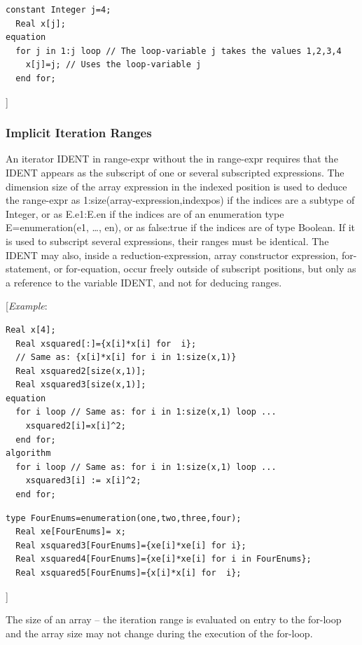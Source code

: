 \documentclass[10pt,a4paper]{report}
\def\doublelabel#1{\label{#1}}
\begin{document}
\begin{lstlisting}[language=modelica]
  constant Integer j=4;
  Real x[j];
equation
  for j in 1:j loop // The loop-variable j takes the values 1,2,3,4
    x[j]=j; // Uses the loop-variable j
  end for;
\end{lstlisting}
{]}

\subsubsection{Implicit Iteration Ranges}\doublelabel{implicit-iteration-ranges}

An iterator IDENT in range-expr without the in range-expr requires that
the IDENT appears as the subscript of one or several subscripted
expressions. The dimension size of the array expression in the indexed
position is used to deduce the range-expr as
1:size(array-expression,indexpos) if the indices are a subtype of
Integer, or as E.e1:E.en if the indices are of an enumeration type
E=enumeration(e1, \ldots{}, en), or as false:true if the indices are of
type Boolean. If it is used to subscript several expressions, their
ranges must be identical. The IDENT may also, inside a
reduction-expression, array constructor expression, for-statement, or
for-equation, occur freely outside of subscript positions, but only as a
reference to the variable IDENT, and not for deducing ranges.

{[}\emph{Example}:

\begin{lstlisting}[language=modelica]
  Real x[4];
  Real xsquared[:]={x[i]*x[i] for  i};
  // Same as: {x[i]*x[i] for i in 1:size(x,1)}
  Real xsquared2[size(x,1)];
  Real xsquared3[size(x,1)];
equation
  for i loop // Same as: for i in 1:size(x,1) loop ...
    xsquared2[i]=x[i]^2;
  end for;
algorithm
  for i loop // Same as: for i in 1:size(x,1) loop ...
    xsquared3[i] := x[i]^2;
  end for;
\end{lstlisting}

\begin{lstlisting}[language=modelica]
  type FourEnums=enumeration(one,two,three,four);
  Real xe[FourEnums]= x;
  Real xsquared3[FourEnums]={xe[i]*xe[i] for i};
  Real xsquared4[FourEnums]={xe[i]*xe[i] for i in FourEnums};
  Real xsquared5[FourEnums]={x[i]*x[i] for  i};
\end{lstlisting}
{]}

The size of an array -- the iteration range is evaluated on entry to the
for-loop and the array size may not change during the execution of the
for-loop.
\end{document}
